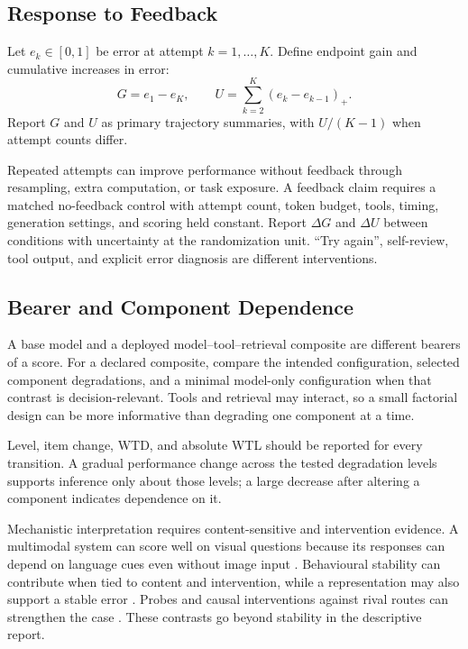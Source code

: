 \documentclass[12pt]{article}
\begin{document}
\subsection{Response to Feedback}\label{ssec:feedback}

Let \(e_k\in[0,1]\) be error at attempt \(k=1,\ldots,K\). Define endpoint gain and cumulative increases in error:
\[
G=e_1-e_K,
\qquad
U=\sum_{k=2}^{K}(e_k-e_{k-1})_+.
\]
Report \(G\) and \(U\) as primary trajectory summaries, with \(U/(K-1)\) when attempt counts differ.

Repeated attempts can improve performance without feedback through resampling, extra computation, or task exposure. A feedback claim requires a matched no-feedback control with attempt count, token budget, tools, timing, generation settings, and scoring held constant. Report \(\Delta G\) and \(\Delta U\) between conditions with uncertainty at the randomization unit. \enquote{Try again}, self-review, tool output, and explicit error diagnosis are different interventions.

\subsection{Bearer and Component Dependence}\label{ssec:component_dependence}

A base model and a deployed model--tool--retrieval composite are different bearers of a score. For a declared composite, compare the intended configuration, selected component degradations, and a minimal model-only configuration when that contrast is decision-relevant. Tools and retrieval may interact, so a small factorial design can be more informative than degrading one component at a time.

Level, item change, WTD, and absolute WTL should be reported for every transition. A gradual performance change across the tested degradation levels supports inference only about those levels; a large decrease after altering a component indicates dependence on it.

Mechanistic interpretation requires content-sensitive and intervention evidence. A multimodal system can score well on visual questions because its responses can depend on language cues even without image input \citep{asadi2026mirage}. Behavioural stability can contribute when tied to content and intervention, while a representation may also support a stable error \citep{yetman2026representation}. Probes and causal interventions against rival routes can strengthen the case \citep{arora_2026_sparse_neuron_basis}. These contrasts go beyond stability in the descriptive report.
\end{document}
